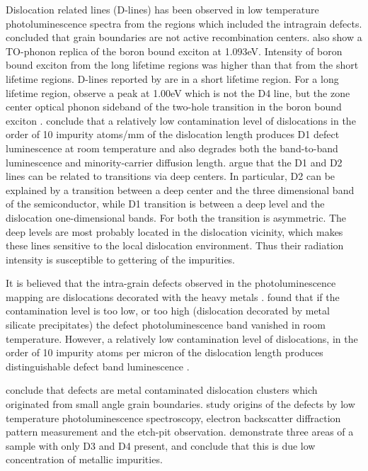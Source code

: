 Dislocation related lines (D-lines) has been observed in low temperature photoluminescence spectra from the regions which included the intragrain defects. \cite{sugimoto06} concluded that grain boundaries are not active recombination centers. \cite{sugimoto06} also show a TO-phonon replica of the boron bound exciton at 1.093eV. Intensity of boron bound exciton from the long lifetime regions was higher than that from the short lifetime regions. D-lines reported by \cite{sauer85} are in a short lifetime region. For a long lifetime region, \cite{sugimoto06} observe a peak at 1.00eV which is not the D4 line, but the zone center optical phonon sideband of the two-hole transition in the boron bound exciton \cite{dean67}. \cite{kitler02} conclude that a relatively low contamination level of dislocations in the order of 10 impurity atoms/mm of the dislocation length produces D1 defect luminescence at room temperature and also degrades both the band-to-band luminescence and minority-carrier diffusion length. \cite{arguirov07} argue that the D1 and D2 lines can be related to transitions via deep centers. In particular, D2 can be explained by a transition between a deep center and the three dimensional band of the semiconductor, while D1 transition is between a deep level and the dislocation one-dimensional bands. For both the transition is asymmetric. The deep levels are most probably located in the dislocation vicinity, which makes these lines sensitive to the local dislocation environment. Thus their radiation intensity is susceptible to gettering of the impurities.

It is believed that the intra-grain defects observed in the photoluminescence mapping are dislocations decorated with the heavy metals \cite{sugimoto06}. \cite{tarasov01} found that if the contamination level is too low, or too high (dislocation decorated by metal silicate precipitates) the defect photoluminescence band vanished in room temperature. However, a relatively low contamination level of dislocations, in the order of 10 impurity atoms per micron of the dislocation length produces distinguishable defect band luminescence \cite{tarasov01,kitler02}. 

\cite{sugimoto07} conclude that defects are metal contaminated dislocation clusters which originated from small angle grain boundaries. \cite{sugimoto07} study origins of the defects by low temperature photoluminescence spectroscopy, electron backscatter diffraction pattern measurement and the etch-pit observation. \cite{arguirov07} demonstrate three areas of a sample with only D3 and D4 present, and conclude that this is due low concentration of metallic impurities.
